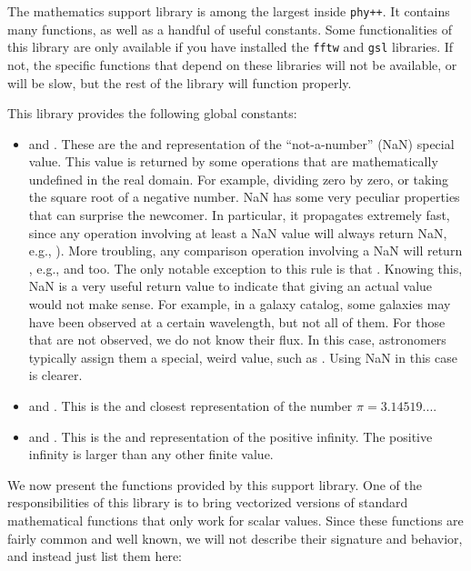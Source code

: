\documentclass[12pt]{report}
\newcommand{\phypp}{\texttt{phy++}\xspace}
\begin{document}
The mathematics support library is among the largest inside \phypp. It contains many functions, as well as a handful of useful constants. Some functionalities of this library are only available if you have installed the \texttt{fftw} and \texttt{gsl} libraries. If not, the specific functions that depend on these libraries will not be available, or will be slow, but the rest of the library will function properly.

This library provides the following global constants:
\begin{itemize}
\item {}  and  . These are the  and  representation of the ``not-a-number'' (NaN) special value. This value is returned by some operations that are mathematically undefined in the real domain. For example, dividing zero by zero, or taking the square root of a negative number. NaN has some very peculiar properties that can surprise the newcomer. In particular, it propagates extremely fast, since any operation involving at least a NaN value will always return NaN, e.g., ). More troubling, any comparison operation involving a NaN will return , e.g.,  and  too. The only notable exception to this rule is that . Knowing this, NaN is a very useful return value to indicate that giving an actual value would not make sense. For example, in a galaxy catalog, some galaxies may have been observed at a certain wavelength, but not all of them. For those that are not observed, we do not know their flux. In this case, astronomers typically assign them a special, weird value, such as . Using NaN in this case is clearer.

\item {}  and  . This is the  and  closest representation of the number $\pi = 3.14519...$.

\item {}  and  . This is the  and  representation of the positive infinity. The positive infinity is larger than any other finite value.
\end{itemize}

We now present the functions provided by this support library. One of the responsibilities of this library is to bring vectorized versions of standard mathematical functions that only work for scalar values. Since these functions are fairly common and well known, we will not describe their signature and behavior, and instead just list them here:
\end{document}
